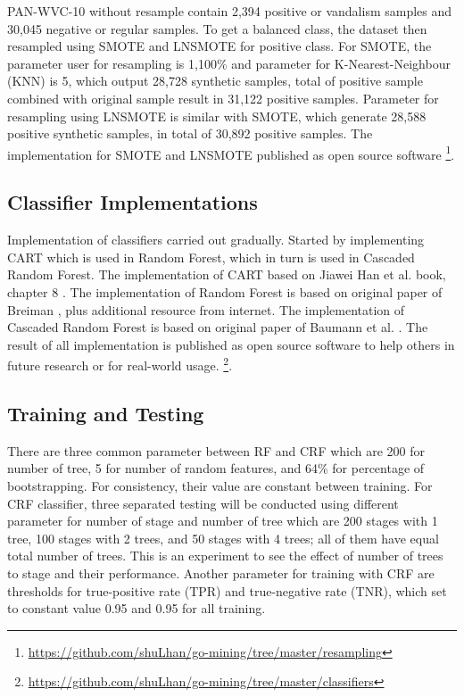 \documentclass[conference,compsoc,a4paper,twocolumn,final]{IEEEtran}
\begin{document}
PAN-WVC-10 without resample contain 2,394 positive or vandalism samples and
30,045 negative or regular samples.
To get a balanced class, the dataset then resampled using SMOTE and LNSMOTE for
positive class.
For SMOTE, the parameter user for resampling is 1,100\% and parameter for
K-Nearest-Neighbour (KNN) is 5, which output 28,728 synthetic samples, total of
positive sample combined with original sample result in 31,122 positive
samples.
Parameter for resampling using LNSMOTE is similar with SMOTE, which generate
28,588 positive synthetic samples, in total of 30,892 positive samples.
The implementation for SMOTE and LNSMOTE published as open source software
\footnote{\url{https://github.com/shuLhan/go-mining/tree/master/resampling}}.



\subsection{Classifier Implementations}

Implementation of classifiers carried out gradually.
Started by implementing CART which is used in Random Forest, which in turn is
used in Cascaded Random Forest.
The implementation of CART based on Jiawei Han et al. book, chapter 8
\cite{han2011data}.
The implementation of Random Forest is based on original paper of Breiman
\cite{breiman2001random}, plus additional resource from internet.
The implementation of Cascaded Random Forest is based on original paper of
Baumann et al.
\cite{baumann2013cascaded}.
The result of all implementation is published as open source software to help
others in future research or for real-world usage.
\footnote{\url{https://github.com/shuLhan/go-mining/tree/master/classifiers}}.


\subsection{Training and Testing}

There are three common parameter between RF and CRF which are 200 for number of
tree, 5 for number of random features, and 64\% for percentage of
bootstrapping.
For consistency, their value are constant between training.
For CRF classifier, three separated testing will be conducted using different
parameter for number of stage and number of tree which are 200 stages with 1
tree, 100 stages with 2 trees, and 50 stages with 4 trees; all of them have
equal total number of trees.
This is an experiment to see the effect of number of trees to stage and their
performance.
Another parameter for training with CRF are thresholds for true-positive rate
(TPR) and true-negative rate (TNR), which set to constant value 0.95 and 0.95
for all training.
\end{document}
